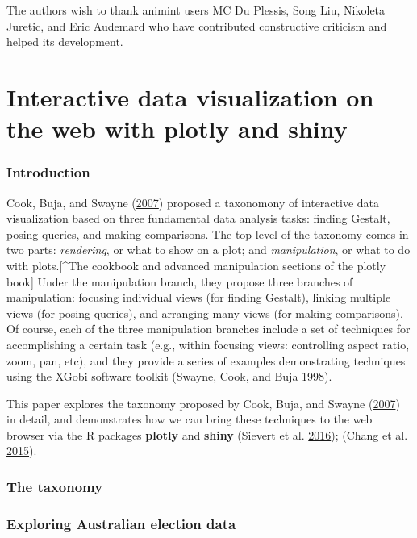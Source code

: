 \documentclass[12pt,]{isuthesis}
\begin{document}
The authors wish to thank animint users MC Du Plessis, Song Liu,
Nikoleta Juretic, and Eric Audemard who have contributed constructive
criticism and helped its development.

\chapter{Interactive data visualization on the web with plotly and shiny}

\subsection{Introduction}\label{introduction-1}

Cook, Buja, and Swayne (\protect\hyperlink{ref-Cook:2007uk}{2007})
proposed a taxonomony of interactive data visualization based on three
fundamental data analysis tasks: finding Gestalt, posing queries, and
making comparisons. The top-level of the taxonomy comes in two parts:
\emph{rendering}, or what to show on a plot; and \emph{manipulation}, or
what to do with plots.{[}\^{}The cookbook and advanced manipulation
sections of the plotly book{]} Under the manipulation branch, they
propose three branches of manipulation: focusing individual views (for
finding Gestalt), linking multiple views (for posing queries), and
arranging many views (for making comparisons). Of course, each of the
three manipulation branches include a set of techniques for
accomplishing a certain task (e.g., within focusing views: controlling
aspect ratio, zoom, pan, etc), and they provide a series of examples
demonstrating techniques using the XGobi software toolkit (Swayne, Cook,
and Buja \protect\hyperlink{ref-xgobi}{1998}).

This paper explores the taxonomy proposed by Cook, Buja, and Swayne
(\protect\hyperlink{ref-Cook:2007uk}{2007}) in detail, and demonstrates
how we can bring these techniques to the web browser via the R packages
\textbf{plotly} and \textbf{shiny} (Sievert et al.
\protect\hyperlink{ref-plotly}{2016}); (Chang et al.
\protect\hyperlink{ref-shiny}{2015}).

\subsection{The taxonomy}\label{the-taxonomy}

\subsection{Exploring Australian election
data}\label{exploring-australian-election-data}
\end{document}
